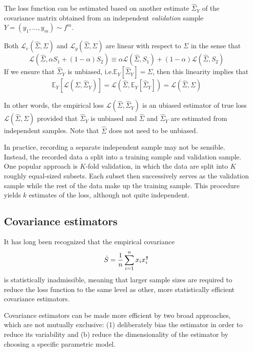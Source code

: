 The loss function can be estimated based on another estimate $\hat\Sigma_Y$ of the covariance matrix obtained from an independent \emph{validation} sample $Y = (y_1,\ldots,y_m)\sim f^m$.  

Both $\mathcal L_e(\hat\Sigma,\Sigma)$ and $\mathcal L_g(\hat\Sigma,\Sigma)$ are linear with respect to $\Sigma$ in the sense that
\begin{equation}
\mathcal L\left(\hat \Sigma,\alpha S_1 + (1-\alpha)S_2\right) 
\equiv 
\alpha\mathcal L(\hat\Sigma,S_1) + (1-\alpha)\mathcal L(\hat\Sigma,S_2)
\end{equation}
If we ensure that  $\hat\Sigma_Y$ is unbiased, i.e.\;$\mathbb E_Y\left[\hat \Sigma_Y\right]=\Sigma$, then this linearity implies that 
\begin{equation}
\mathbb E_Y \left[\mathcal L(\hat\Sigma,\hat\Sigma_Y)\right]
=
\mathcal L\left(\hat\Sigma,\mathbb E_Y \left[\hat\Sigma_Y\right]\right)
= 
\mathcal L(\hat\Sigma,\Sigma)
\end{equation}

In other words, the empirical loss $\mathcal L(\hat\Sigma,\hat\Sigma_Y)$ is an ubiased estimator of true loss $\mathcal L(\hat\Sigma,\Sigma)$ provided that $\hat\Sigma_Y$ is unbiased and $\hat\Sigma$ and $\hat\Sigma_Y$ are estimated from independent samples.  Note that $\hat\Sigma$ does not need to be unbiased.  

In practice, recording a separate independent sample may not be sensible.  Instead, the recorded data a split into a training sample and validation sample.  One popular approach is $K$-fold validation, in which the data are split into $K$ roughly equal-sized subsets.  Each subset then successively serves as the validation  sample while the rest of the data make up the training sample. This procedure yields $k$ estimates of the loss, although not quite independent. 
 
\subsection*{Covariance estimators}
It has long been recognized that the empirical covariance 
\begin{equation}
\hat S = \frac 1 n \sum\limits_{i=1}^n x_i x_i^\intercal
\end{equation}
is statistically inadmissible, meaning that larger sample sizes are required to reduce the loss function to the same level as other, more statistically efficient covariance estimators.

Covariance estimators can be made more efficient by two broad approaches, which are not mutually exclusive: (1) deliberately bias the estimator in order to reduce its variability and (b) reduce the dimensionality of the estimator by choosing a specific parametric model. 

